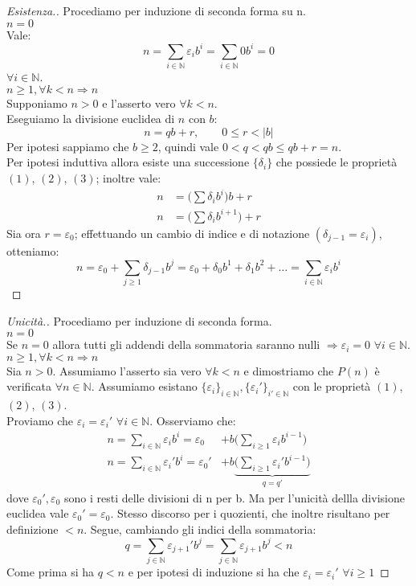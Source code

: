 \documentclass[12pt]{article}
\newcommand{\N}{\mathbb{N}}
\newcommand{\implica}{\Longrightarrow}
\newcommand{\nin}{\forall n\in\N}
\newcommand{\eps}{\varepsilon}
\renewcommand\qedsymbol{$\blacksquare$}
\newcommand{\baseinduz}[1]{\\[1\baselineskip]{\boldmath$n = #1$}}
\newcommand{\induzdue}[1]{\\[1\baselineskip]{\boldmath$n \ge #1, \forall k < n \implica n$}}
\begin{document}
\renewcommand\qedsymbol{$\square$}
\begin{proof}[Esistenza.]
	Procediamo per induzione di seconda forma su n.
	\baseinduz{0}
	\\Vale:
	$$ n = \sum_{i\in\N} \eps_i b^i = \sum_{i\in\N} 0 b^i = 0$$
	$\forall i \in\N$.
	\induzdue{1}
	\\Supponiamo $n > 0$ e l'asserto vero $\forall k < n$.
	\\Eseguiamo la divisione euclidea di $n$ con $b$:
	$$n = qb + r, \qquad0 \le r < |b|$$
	Per ipotesi sappiamo che $b \ge 2$, quindi vale $ 0 < q < qb \le qb + r = n$.
	\\Per ipotesi induttiva allora esiste una successione $\{\delta_i\}$ che possiede le proprietà $(1)$, $(2)$, $(3)$; inoltre vale:
	\begin{align*}
		n & = \Big(\sum \delta_i b^i\Big) b + r   \\
		n & = \Big(\sum \delta_i b^{i+1}\Big) + r
	\end{align*}
	Sia ora $r = \eps_0$; effettuando un cambio di indice e di notazione $(\delta_{j-1} = \eps_i)$, otteniamo:
	$$ n = \eps_0 + \sum_{j \ge 1} \delta_{j-1}b^j = \eps_0 + \delta_0 b^1 + \delta_1 b^2 + \ldots = \sum_{i\in\N} \eps_i b^i $$
\end{proof}

\renewcommand\qedsymbol{$\blacksquare$}
\begin{proof}[Unicità.]
	Procediamo per induzione di seconda forma.
	\baseinduz{0}
	\\Se $n = 0$ allora tutti gli addendi della sommatoria saranno nulli $\implica \eps_i = 0$ $\forall i \in \N$.
	\induzdue{1}
	\\Sia $n > 0$. Assumiamo l'asserto sia vero $\forall k < n$ e dimostriamo che $P(n)$ è verificata $\nin$.
	Assumiamo esistano $\{\eps_i\}_{i\in\N}, \{\eps_i'\}_{i' \in\N}$ con le proprietà $(1)$, $(2)$, $(3)$.\\Proviamo che $\eps_i = \eps_{i}'$ $\forall i \in \N$. Osserviamo che:
	\begin{align*}
		n =\sum_{i\in\N} \eps_i b^i = \eps_0       & + b\Bigg( \sum_{i \ge 1} \eps_i b^{i-1}\Bigg)                          \\
		n =\sum_{i\in\N} \eps_{i}' b^i = \eps_{0}' & + b\underbrace{\Bigg( \sum_{i \ge 1} \eps_{i}' b^{i-1}\Bigg)}_{q = q'}
	\end{align*}
	dove $\eps_{0}',\eps_{0}$ sono i resti delle divisioni di n per b. Ma per l'unicità dellla divisione euclidea vale $\eps_{0}' = \eps_{0}$. Stesso discorso per i quozienti, che inoltre risultano per definizione $< n$. Segue, cambiando gli indici della sommatoria:
	$$q = \sum_{j\in\N} \eps_{j+1}' b^j = \sum_{j\in\N} \eps_{j+1} b^j < n $$
	Come prima si ha $q < n$ e per ipotesi di induzione si ha che $\eps_i = \eps_{i}'$ $\forall i \ge 1$
\end{proof}
\end{document}
